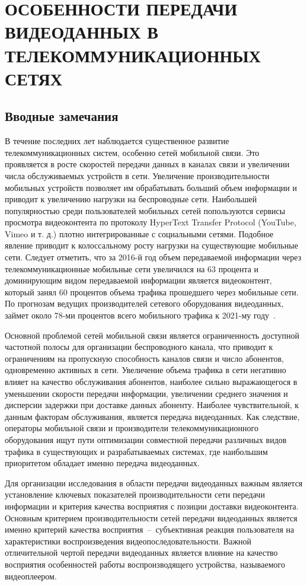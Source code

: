 \newpage
\chapter{ОСОБЕННОСТИ ПЕРЕДАЧИ ВИДЕОДАННЫХ В ТЕЛЕКОММУНИКАЦИОННЫХ СЕТЯХ}
\label{chap1}

\section{Вводные замечания}

В течение последних лет наблюдается существенное развитие телекоммуникационных систем, особенно сетей мобильной связи. Это проявляется в росте скоростей передачи данных в каналах связи и увеличении числа обслуживаемых устройств в сети. Увеличение производительности мобильных устройств позволяет им обрабатывать больший объем информации и приводит к увеличению нагрузки на беспроводные сети. Наибольшей популярностью среди пользователей мобильных сетей попользуются сервисы просмотра видеоконтента по протоколу HyperText Transfer Protocol (YouTube, Vimeo и т. д.) плотно интегрированные с социальными сетями. Подобное явление приводит к колоссальному росту нагрузки на существующие мобильные сети. Следует отметить, что за 2016-й год объем передаваемой информации через телекоммуникационные мобильные сети увеличился на 63 процента и доминирующим видом передаваемой информации является видеоконтент, который занял 60 процентов объема трафика прошедшего через мобильные сети. По прогнозам ведущих производителей сетевого оборудования видеоданных, займет около 78-ми процентов всего мобильного трафика к 2021-му году~\cite{Cisco}.

Основной проблемой сетей мобильной связи является ограниченность доступной частотной полосы для организации беспроводного канала, что приводит к ограничениям на пропускную способность каналов связи и число абонентов, одновременно активных в сети. Увеличение объема трафика в сети негативно влияет на качество обслуживания абонентов, наиболее сильно выражающегося в уменьшении скорости передачи информации, увеличении среднего значения и дисперсии задержки при доставке данных абоненту. Наиболее чувствительной, к данным факторам обслуживания, является передача видеоданных. Как следствие, операторы мобильной связи и производители телекоммуникационного оборудования ищут пути оптимизации совместной передачи различных видов трафика в существующих и разрабатываемых системах, где наибольшим приоритетом обладает именно передача видеоданных.

Для организации исследования в области передачи видеоданных важным является установление ключевых показателей производительности сети передачи информации и критерия качества восприятия с позиции доставки видеоконтента. Основным критерием производительности сетей передачи видеоданных является именно критерий качества восприятия~--~субъективная реакция пользователя на характеристики воспроизведения видеопоследовательности. Важной отличительной чертой передачи видеоданных является влияние на качество восприятия особенностей работы воспроизводящего устройства, называемого видеоплеером.

